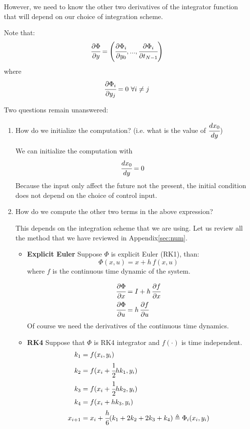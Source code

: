 However, we need to know the other two derivatives of the integrator function that will depend on our choice of integration scheme.

Note that:
\[\cfrac{\partial\Phi}{\partial y} = \left(\cfrac{\partial\Phi_i}{\partial y_0},...,\cfrac{\partial\Phi_i}{\partial t_{N-1}}\right)\]
where 
\[\cfrac{\partial\Phi_i}{\partial y_j} = 0\,\,\forall i\ne j\]

Two questions remain unanswered:
\begin{enumerate}
\item How do we initialize the computation? (i.e. what is the value of $\cfrac{dx_0}{dy}$)

We can initialize the computation with 
\[\cfrac{dx_0}{dy} = 0\]
Because the input only affect the future not the present, the initial condition does not depend on the choice of control input.
\item How do we compute the other two terms in the above expression?

This depends on the integration scheme that we are using. Let us review all the method that we have reviewed in Appendix\ref{sec:num}.
\begin{itemize}
\item \textbf{Explicit Euler}
Suppose $\Phi$ is explicit Euler (RK1), than:
\[\Phi(x,u) = x + h\,f(x,u)\]
where $f$ is the continuous time dynamic of the system.

\begin{align*}
\cfrac{\partial\Phi}{\partial x} &= I + h\,\cfrac{\partial f}{\partial x}\\
\cfrac{\partial\Phi}{\partial u} &= h\,\cfrac{\partial f}{\partial u}
\end{align*}
Of course we need the derivatives of the continuous time dynamics.
\item \textbf{RK4}
Suppose that $\Phi$ is RK4 integrator and $f(\cdot)$ is time independent.
\begin{align*}
k_1 &= f(x_i, y_i)\\
k_2 &= f(x_i+\cfrac{1}{2}hk_1, y_i)\\
k_3 &= f(x_i+\cfrac{1}{2}hk_2, y_i)\\
k_4 &= f(x_i+hk_3, y_i)\\
x_{i+1} &= x_i + \cfrac{h}{6}(k_1 + 2k_2 + 2k_3 + k_4) \triangleq \Phi_i(x_i, y_i)
\end{align*}


\end{itemize}
\end{enumerate}
